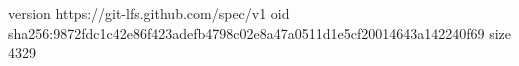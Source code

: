 version https://git-lfs.github.com/spec/v1
oid sha256:9872fdc1c42e86f423adefb4798c02e8a47a0511d1e5cf20014643a142240f69
size 4329
